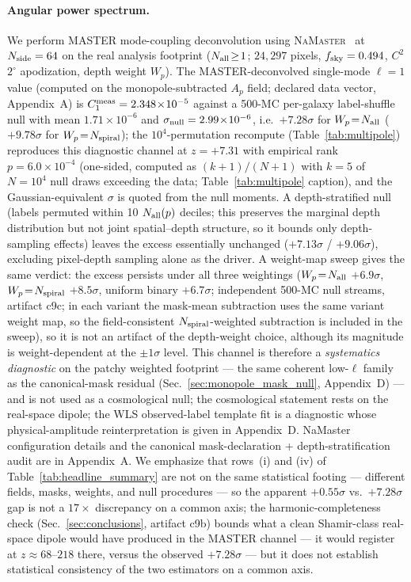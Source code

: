 \documentclass[aps,prd,twocolumn,superscriptaddress,preprintnumbers,nofootinbib,longbibliography,floatfix]{revtex4-2}
\newcommand{\sigmaunit}{\sigma}
\begin{document}
\paragraph{Angular power spectrum.}
We perform MASTER mode-coupling deconvolution using \textsc{NaMaster}~\cite{Alonso:2019} at $N_{\rm side}=64$ on the real analysis footprint ($N_{\rm all}\!\geq\!1$; $24{,}297$ pixels, $f_{\rm sky}=0.494$, $C^2$ $2^\circ$ apodization, depth weight $W_p$). The MASTER-deconvolved single-mode $\ell\!=\!1$ value (computed on the monopole-subtracted $A_p$ field; declared data vector, Appendix~A) is $C_1^{\rm meas}=2.348\!\times\!10^{-5}$ against a 500-MC per-galaxy label-shuffle null with mean $1.71\!\times\!10^{-6}$ and $\sigma_{\rm null}=2.99\!\times\!10^{-6}$, i.e.\ $+7.28\sigmaunit$ for $W_p\!=\!N_{\rm all}$ ($+9.78\sigmaunit$ for $W_p\!=\!N_{\rm spiral}$); the $10^4$-permutation recompute (Table~\ref{tab:multipole}) reproduces this diagnostic channel at $z=+7.31$ with empirical rank $p=6.0\times10^{-4}$ (one-sided, computed as $(k+1)/(N+1)$ with $k\!=\!5$ of $N\!=\!10^4$ null draws exceeding the data; Table~\ref{tab:multipole} caption), and the Gaussian-equivalent $\sigma$ is quoted from the null moments. A depth-stratified null (labels permuted within 10 $N_{\rm all}(p)$ deciles; this preserves the marginal depth distribution but not joint spatial--depth structure, so it bounds only depth-sampling effects) leaves the excess essentially unchanged ($+7.13\sigmaunit$ / $+9.06\sigmaunit$), excluding pixel-depth sampling alone as the driver. A weight-map sweep gives the same verdict: the excess persists under all three weightings ($W_p\!=\!N_{\rm all}$ $+6.9\sigmaunit$, $W_p\!=\!N_{\rm spiral}$ $+8.5\sigmaunit$, uniform binary $+6.7\sigmaunit$; independent 500-MC null streams, artifact c9c; in each variant the mask-mean subtraction uses the same variant weight map, so the field-consistent $N_{\rm spiral}$-weighted subtraction is included in the sweep), so it is not an artifact of the depth-weight choice, although its magnitude is weight-dependent at the $\pm1\sigmaunit$ level. This channel is therefore a \emph{systematics diagnostic} on the patchy weighted footprint --- the same coherent low-$\ell$ family as the canonical-mask residual (Sec.~\ref{sec:monopole_mask_null}, Appendix~D) --- and is not used as a cosmological null; the cosmological statement rests on the real-space dipole; the WLS observed-label template fit is a diagnostic whose physical-amplitude reinterpretation is given in Appendix~D. NaMaster configuration details and the canonical mask-declaration + depth-stratification audit are in Appendix~A. We emphasize that rows~(i) and (iv) of Table~\ref{tab:headline_summary} are not on the same statistical footing --- different fields, masks, weights, and null procedures --- so the apparent $+0.55\sigmaunit$ vs.\ $+7.28\sigmaunit$ gap is not a $17\times$ discrepancy on a common axis; the harmonic-completeness check (Sec.~\ref{sec:conclusions}, artifact c9b) bounds what a clean Shamir-class real-space dipole would have produced in the MASTER channel --- it would register at $z\approx68$--$218$ there, versus the observed $+7.28\sigmaunit$ --- but it does not establish statistical consistency of the two estimators on a common axis.
\end{document}
